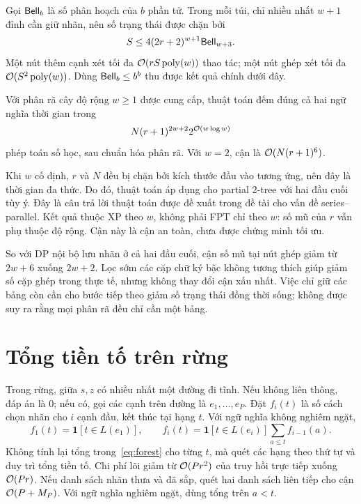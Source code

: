 Gọi $\mathsf{Bell}_b$ là số phân hoạch của $b$ phần tử. Trong mỗi túi, chỉ nhiều nhất $w+1$ đỉnh cần giữ nhãn, nên số trạng thái được chặn bởi
\begin{equation}
  S\le4(2r+2)^{w+1}\mathsf{Bell}_{w+3}.
  \label{eq:states}
\end{equation}
Một nút thêm cạnh xét tối đa $\mathcal{O}(rS\operatorname{poly}(w))$ thao tác; một nút ghép xét tối đa $\mathcal{O}(S^2\operatorname{poly}(w))$. Dùng $\mathsf{Bell}_b\le b^b$ thu được kết quả chính dưới đây.

\begin{proposition}
Với phân rã cây độ rộng $w\ge1$ được cung cấp, thuật toán đếm đúng cả hai ngữ nghĩa thời gian trong
\begin{equation}
  N(r+1)^{2w+2}2^{\mathcal{O}(w\log w)}
  \label{eq:main-bound}
\end{equation}
phép toán số học, sau chuẩn hóa phân rã. Với $w=2$, cận là $\mathcal{O}(N(r+1)^6)$.
\end{proposition}

Khi $w$ cố định, $r$ và $N$ đều bị chặn bởi kích thước đầu vào tương ứng, nên đây là thời gian đa thức. Do đó, thuật toán áp dụng cho partial 2-tree với hai đầu cuối tùy ý. Đây là câu trả lời thuật toán được đề xuất trong đề tài cho vấn đề series--parallel. Kết quả thuộc XP theo $w$, không phải FPT chỉ theo $w$: số mũ của $r$ vẫn phụ thuộc độ rộng. Cận này là cận an toàn, chưa được chứng minh tối ưu.

So với DP nội bộ lưu nhãn ở cả hai đầu cuối, cận số mũ tại nút ghép giảm từ $2w+6$ xuống $2w+2$. Lọc sớm các cặp chữ ký bậc không tương thích giúp giảm số cặp ghép trong thực tế, nhưng không thay đổi cận xấu nhất. Việc chỉ giữ các bảng còn cần cho bước tiếp theo giảm số trạng thái đồng thời sống; không được suy ra rằng mọi phân rã đều chỉ cần một bảng.

\section{Tổng tiền tố trên rừng}

Trong rừng, giữa $s,z$ có nhiều nhất một đường đi tĩnh. Nếu không liên thông, đáp án là $0$; nếu có, gọi các cạnh trên đường là $e_1,\ldots,e_P$. Đặt $f_i(t)$ là số cách chọn nhãn cho $i$ cạnh đầu, kết thúc tại hạng $t$. Với ngữ nghĩa không nghiêm ngặt,
\begin{equation}
  f_1(t)=\mathbf{1}[t\in L(e_1)],\qquad
  f_i(t)=\mathbf{1}[t\in L(e_i)]\sum_{a\le t}f_{i-1}(a).
  \label{eq:forest}
\end{equation}
Không tính lại tổng trong~\eqref{eq:forest} cho từng $t$, mà quét các hạng theo thứ tự và duy trì tổng tiền tố. Chi phí lõi giảm từ $\mathcal{O}(Pr^2)$ của truy hồi trực tiếp xuống $\mathcal{O}(Pr)$. Nếu danh sách nhãn thưa và đã sắp, quét hai danh sách liên tiếp cho cận $\mathcal{O}(P+M_P)$. Với ngữ nghĩa nghiêm ngặt, dùng tổng trên $a<t$.

